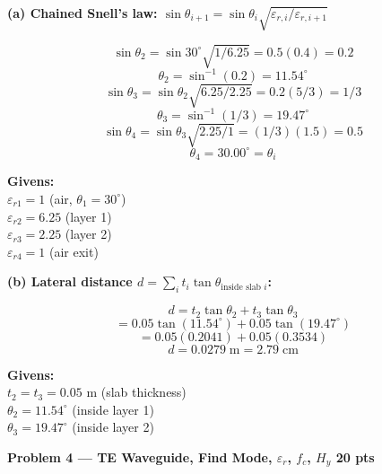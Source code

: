 \documentclass[11pt,letterpaper]{article}
\newcommand{\probhead}[2]{%
  \colorbox{purplebg}{\parbox{\dimexpr\linewidth-2\fboxsep}%
  {\color{purple}\large\textbf{Problem #1 \hfill #2}}}}
\begin{document}
\textbf{(a) Chained Snell's law: $\sin\theta_{i+1} = \sin\theta_i\sqrt{\varepsilon_{r,i}/\varepsilon_{r,i+1}}$}

\begin{minipage}[t]{0.55\linewidth}\vspace{0pt}
\[\sin\theta_2 = \sin 30^\circ\sqrt{1/6.25} = 0.5(0.4) = 0.2\]
\[\boxed{\theta_2 = \sin^{-1}(0.2) = 11.54^\circ}\]
\[\sin\theta_3 = \sin\theta_2\sqrt{6.25/2.25} = 0.2(5/3) = 1/3\]
\[\boxed{\theta_3 = \sin^{-1}(1/3) = 19.47^\circ}\]
\[\sin\theta_4 = \sin\theta_3\sqrt{2.25/1} = (1/3)(1.5) = 0.5\]
\[\boxed{\theta_4 = 30.00^\circ = \theta_i}\]
\end{minipage}\hfill
\begin{minipage}[t]{0.42\linewidth}\vspace{0pt}
\begin{givens}
\textbf{Givens:}\\
$\varepsilon_{r1} = 1$ (air, $\theta_1 = 30^\circ$)\\
$\varepsilon_{r2} = 6.25$ (layer 1)\\
$\varepsilon_{r3} = 2.25$ (layer 2)\\
$\varepsilon_{r4} = 1$ (air exit)
\end{givens}
\end{minipage}

\textbf{(b) Lateral distance $d = \sum_i t_i\tan\theta_{\text{inside slab }i}$:}

\begin{minipage}[t]{0.55\linewidth}\vspace{0pt}
\[d = t_2\tan\theta_2 + t_3\tan\theta_3\]
\[= 0.05\tan(11.54^\circ) + 0.05\tan(19.47^\circ)\]
\[= 0.05(0.2041) + 0.05(0.3534)\]
\[\boxed{d = 0.0279\;\text{m} = 2.79\;\text{cm}}\]
\end{minipage}\hfill
\begin{minipage}[t]{0.42\linewidth}\vspace{0pt}
\begin{givens}
\textbf{Givens:}\\
$t_2 = t_3 = 0.05$ m (slab thickness)\\
$\theta_2 = 11.54^\circ$ (inside layer 1)\\
$\theta_3 = 19.47^\circ$ (inside layer 2)
\end{givens}
\end{minipage}

\newpage
\probhead{4 --- TE Waveguide, Find Mode, $\varepsilon_r$, $f_c$, $H_y$}{20 pts}
\end{document}

